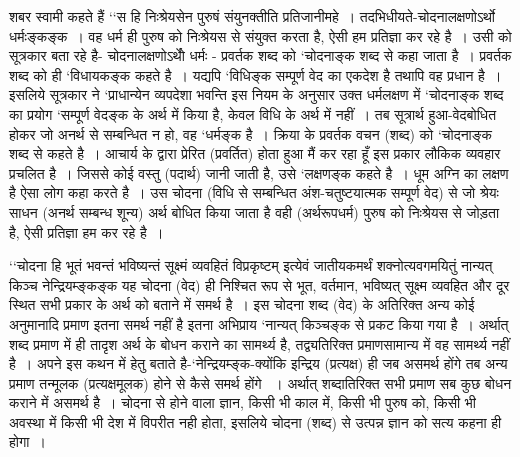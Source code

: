 {शबर स्वामी कहते हैं ‘‘स हि निःश्रेयसेन पुरुषं संयुनक्तीति प्रतिजानीमहे~। तदभिधीयते-चोदनालक्षणोऽर्थो धर्मःङ्कङ्क~। वह धर्म ही पुरुष को निःश्रेयस से संयुक्त करता है, ऐसी हम प्रतिज्ञा कर रहे है~। उसी को सूत्रकार बता रहे है- चोदनालक्षणोऽर्थोे धर्मः - प्रवर्तक शब्द को ‘चोदनाङ्क शब्द से कहा जाता है~। प्रवर्तक शब्द को ही ‘विधायकङ्क कहते है~। यद्यपि ‘विधिङ्क सम्पूर्ण वेद का एकदेश है तथापि वह प्रधान है~। इसलिये सूत्रकार ने ‘प्राधान्येन व्यपदेशा भवन्ति इस नियम के अनुसार उक्त धर्मलक्षण में ‘चोदनाङ्क शब्द का प्रयोग ‘सम्पूर्ण वेदङ्क के अर्थ में किया है, केवल विधि के अर्थ में नहीं~। तब सूत्रार्थ हुआ-वेदबोधित होकर जो अनर्थ से सम्बन्धित न हो, वह ‘धर्मङ्क है~। क्रिया के प्रवर्तक वचन (शब्द) को ‘चोदनाङ्क शब्द से कहते है~। आचार्य के द्वारा प्रेरित (प्रवर्तित) होता हुआ मैं कर रहा हूँ इस प्रकार लौकिक व्यवहार प्रचलित है~। जिससे कोई वस्तु (पदार्थ) जानी जाती है, उसे ‘लक्षणङ्क कहते है~। धूम अग्नि का लक्षण है ऐसा लोग कहा करते है~। उस चोदना (विधि से सम्बन्धित अंश-चतुष्टयात्मक सम्पूर्ण वेद) से जो श्रेयः साधन (अनर्थ सम्बन्ध शून्य) अर्थ बोधित किया जाता है वही (अर्थरूपधर्म) पुरुष को निःश्रेयस से जोड़ता है, ऐसी प्रतिज्ञा हम कर रहे है~।

‘‘चोदना हि भूतं भवन्तं भविष्यन्तं सूक्ष्मं व्यवहितं विप्रकृष्टम् इत्येवं जातीयकमर्थं शक्नोत्यवगमयितुं नान्यत् किञ्च नेन्द्रियम्ङ्कङ्क यह चोदना (वेद) ही निश्चित रूप से भूत, वर्तमान, भविष्यत् सूक्ष्म व्यवहित और दूर स्थित सभी प्रकार के अर्थ को बताने में समर्थ है~। इस चोदना शब्द (वेद) के अतिरिक्त अन्य कोई अनुमानादि प्रमाण इतना समर्थ नहीं है इतना अभिप्राय ‘नान्यत् किञ्चङ्क से प्रकट किया गया है~। अर्थात् शब्द प्रमाण में ही तादृश अर्थ के बोधन कराने का सामर्थ्य है, तद्व्यतिरिक्त प्रमाणसामान्य में वह सामर्थ्य नहीं है~। अपने इस कथन में हेतु बताते है-‘नेन्द्रियम्ङ्क-क्योंकि इन्द्रिय (प्रत्यक्ष) ही जब असमर्थ होंगे तब अन्य प्रमाण तन्मूलक (प्रत्यक्षमूलक) होने से कैसे समर्थ होंगे ~। अर्थात् शब्दातिरिक्त सभी प्रमाण सब कुछ बोधन कराने में असमर्थ है~। चोदना से होने वाला ज्ञान, किसी भी काल में, किसी भी पुरुष को, किसी भी अवस्था में किसी भी देश में विपरीत नही होता, इसलिये चोदना (शब्द) से उत्पन्न ज्ञान को सत्य कहना ही होगा~। 

}
